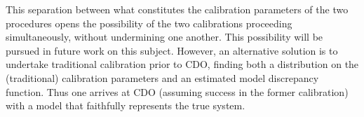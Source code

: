 \documentclass{article}
\begin{document}
This separation between what constitutes the calibration parameters of the two procedures opens the possibility of the two calibrations proceeding simultaneously, without undermining one another. This possibility will be pursued in future work on this subject. However, an alternative solution is to undertake traditional calibration prior to CDO, finding both a distribution on the (traditional) calibration parameters and an estimated model discrepancy function. Thus one arrives at CDO (assuming success in the former calibration) with a model that faithfully represents the true system.

\end{document}
